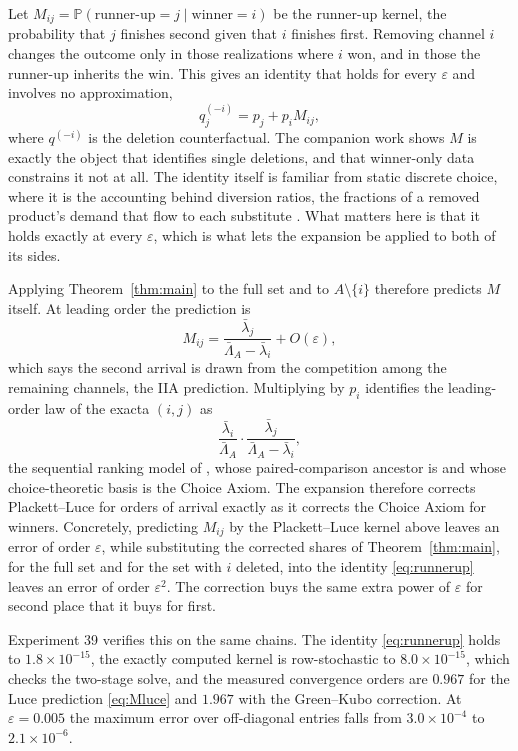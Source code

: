 \documentclass[11pt]{article}
\theoremstyle{remark}
\newcommand{\Prob}{\mathbb{P}}
\newcommand{\lbar}{\bar{\lambda}}
\begin{document}
Let $M_{ij} = \Prob(\text{runner-up} = j \mid \text{winner} = i)$ be the
runner-up kernel, the probability that $j$ finishes second given that $i$
finishes first. Removing channel $i$ changes the outcome only in those
realizations where $i$ won, and in those the runner-up inherits the win. This
gives an identity that holds for every $\varepsilon$ and involves no
approximation,
\begin{equation}\label{eq:runnerup}
  q^{(-i)}_j = p_j + p_i M_{ij} ,
\end{equation}
where $q^{(-i)}$ is the deletion counterfactual. The companion work shows
$M$ is exactly the object that identifies single deletions, and that
winner-only data constrains it not at all. The identity itself is familiar
from static discrete choice, where it is the accounting behind diversion
ratios, the fractions of a removed product's demand that flow to each
substitute \citep{conlon2021}. What matters here is that it holds exactly at
every $\varepsilon$, which is what lets the expansion be applied to both of
its sides.

Applying Theorem~\ref{thm:main} to the full set and to $A \setminus \{i\}$
therefore predicts $M$ itself. At leading order the prediction is
\begin{equation}\label{eq:Mluce}
  M_{ij} = \frac{\lbar_j}{\bar\Lambda_A - \lbar_i} + O(\varepsilon) ,
\end{equation}
which says the second arrival is drawn from the competition among the
remaining channels, the IIA prediction. Multiplying by $p_i$ identifies the
leading-order law of the exacta $(i, j)$ as
\[
  \frac{\lbar_i}{\bar\Lambda_A} \cdot
  \frac{\lbar_j}{\bar\Lambda_A - \lbar_i} ,
\]
the sequential ranking model of \citet{plackett1975}, whose paired-comparison
ancestor is \citet{bradley1952} and whose choice-theoretic basis is the Choice
Axiom. The expansion therefore corrects Plackett--Luce for orders of arrival
exactly as it corrects the Choice Axiom for winners. Concretely, predicting
$M_{ij}$ by the Plackett--Luce kernel above leaves an error of order
$\varepsilon$, while substituting the corrected shares of
Theorem~\ref{thm:main}, for the full set and for the set with $i$ deleted,
into the identity \eqref{eq:runnerup} leaves an error of order
$\varepsilon^2$. The correction buys the same extra power of $\varepsilon$
for second place that it buys for first.

Experiment 39 verifies this on the same chains. The identity
\eqref{eq:runnerup} holds to $1.8\times10^{-15}$, the exactly computed kernel
is row-stochastic to $8.0\times10^{-15}$, which checks the two-stage solve, and
the measured convergence orders are
$0.967$ for the Luce prediction \eqref{eq:Mluce} and $1.967$ with the
Green--Kubo correction. At $\varepsilon = 0.005$ the maximum error over
off-diagonal entries falls from $3.0\times10^{-4}$ to $2.1\times10^{-6}$.
\end{document}
